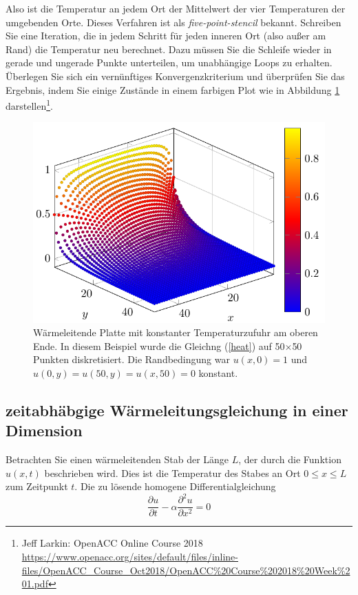 \documentclass[headsepline=3pt,headinclude=true,12pt,oneside]{scrartcl}
\begin{document}
	Also ist die Temperatur an jedem Ort der Mittelwert der vier Temperaturen der umgebenden Orte. Dieses Verfahren ist als \textit{five-point-stencil} bekannt.
	Schreiben Sie eine Iteration, die in jedem Schritt für jeden inneren Ort (also außer am Rand) die Temperatur neu berechnet. Dazu müssen Sie die Schleife wieder in gerade und ungerade Punkte unterteilen, um unabhängige Loops zu erhalten. Überlegen Sie sich ein vernünftiges Konvergenzkriterium und überprüfen Sie das Ergebnis, indem Sie einige Zustände in einem farbigen Plot wie in Abbildung \ref{platte} darstellen\footnote{Jeff Larkin: OpenACC Online Course 2018\\ \url{https://www.openacc.org/sites/default/files/inline-files/OpenACC_Course_Oct2018/OpenACC\%20Course\%202018\%20Week\%201.pdf}}.
	\begin{figure}[h]
		\centering
		\includegraphics[scale=0.5]{exercise/platte.png}
		\caption{Wärmeleitende Platte mit konstanter Temperaturzufuhr am oberen Ende. In diesem Beispiel wurde die Gleichng (\ref{heat}) auf 50$\times$50 Punkten diskretisiert. Die Randbedingung war $u(x,0) = 1$ und $u(0,y) = u(50,y) = u(x,50) = 0$ konstant.}
		\label{platte}		
	\end{figure}
	
	\subsection{zeitabhäbgige Wärmeleitungsgleichung in einer Dimension}
	Betrachten Sie einen wärmeleitenden Stab der Länge $L$, der durch die Funktion $u(x,t)$ beschrieben wird. Dies ist die Temperatur des Stabes an Ort $0\leq x \leq L$ zum Zeitpunkt $t$. Die zu lösende homogene Differentialgleichung
	\begin{equation}\label{diff}
		\frac{\partial u}{\partial t} - \alpha\frac{\partial^2 u}{\partial x^2} = 0
	\end{equation}
	
\end{document}
